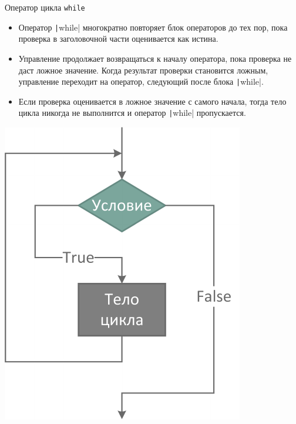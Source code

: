 \documentclass[aspectratio=169]{beamer}	%
\begin{document}
\begin{frame}[fragile]{Оператор цикла \texttt{while}}

\scriptsize
\begin{multicols}{2}
\begin{itemize}
	\item Оператор \texttt|while| многократно повторяет блок операторов до тех пор, пока проверка в заголовочной части оценивается как истина.
	
	\item Управление продолжает возвращаться к началу оператора, пока проверка не даст ложное значение. Когда результат проверки становится ложным, управление переходит на оператор, следующий после блока \texttt|while|.
	
	\item Если проверка оценивается в ложное значение с самого начала, тогда тело цикла никогда не выполнится и оператор \texttt|while| пропускается.
\end{itemize}
\columnbreak
\centering
\includegraphics[width=.8\linewidth]{pics/while}
\end{multicols}
\vfill
\end{frame}
\end{document}
